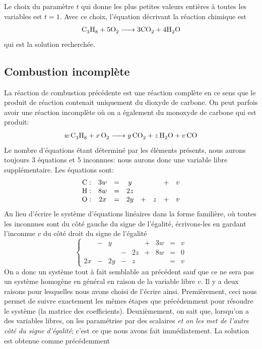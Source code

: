 Le choix du paramètre $t$ qui donne les plus petites valeurs entières
à toutes les variables est $t=1$. Avec ce choix, l'équation décrivant
la réaction chimique est
\[
\ce{C3H8 + 5 O2 -> 3 CO2 + 4 H2O }
\]
qui est la solution recherchée.

\subsection{Combustion incomplète}

La réaction de combustion précédente est une réaction complète en ce sens que
le produit de réaction contenait uniquement du dioxyde de carbone.
On peut parfois avoir une réaction incomplète où on a également du
monoxyde de carbone qui est produit:
\[
\ce{$w\,$C3H8 + $x\,$O2 -> $y\,$CO2 + $z\,$H2O + $v\,$CO}
\]
Le nombre d'équations étant déterminé par les éléments présents, nous aurons toujours
3 équations et 5 inconnues: nous aurons donc une variable libre supplémentaire.
Les équations sont:
\[
\begin{matrix}
\cf{C}: & 3w &=& y && &+& v \\
\cf{H}: & 8w &=& 2z \\
\cf{O}: & 2x &=& 2y &+& z &+& v
\end{matrix}
\]
Au lieu d'écrire le système d'équations linéaires dans la forme familière, où toutes
les inconnues sont du côté gauche du signe de l'égalité, écrivons-les en gardant
l'inconnue $v$ du côté droit du signe de l'égalité
\[
\left\{
\begin{matrix}
&-& y && &+& 3w &=& v \\
&& &-& 2z &+& 8w &=& 0 \\
2x &-& 2y &-& z && &=& v
\end{matrix}
\right.
\]
On a donc un système tout à fait semblable au précédent sauf que ce ne sera pas
un système homogène en général en raison de la variable libre $v$.  Il y a deux raisons
pour lesquelles nous avons choisi de l'écrire ainsi. Premièrement, ceci nous permet
de suivre exactement les mêmes étapes que précédemment pour résoudre le système (la
matrice des coefficients).  Deuxièmement, on sait que, lorsqu'on a des variables
libres, on les paramétrise par des scalaires \textit{et on les met de l'autre côté du signe
d'égalité}; c'est ce que nous avons fait immédiatement.   La solution est obtenue comme précédemment
